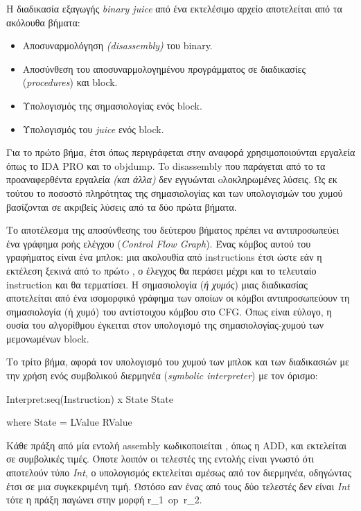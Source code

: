 Η διαδικασία εξαγωγής \emph{binary juice} από ένα εκτελέσιμο αρχείο αποτελείται από τα ακόλουθα βήματα:
\begin{itemize}
	\item Αποσυναρμολόγηση \emph{(disassembly)} του binary.
	\item Αποσύνθεση του αποσυναρμολογημένου προγράμματος σε διαδικασίες (\emph{procedures}) και block.
	\item Υπολογισμός της σημασιολογίας ενός block.
	\item Υπολογισμός του \emph{juice} ενός block.
\end{itemize}

Για το πρώτο βήμα, έτσι όπως περιγράφεται στην αναφορά χρησιμοποιούνται εργαλεία όπως το IDA PRO\cite{ida} και το objdump\cite{objdump}.
To disassembly που παράγεται από το τα προαναφερθέντα εργαλεία \emph{(και άλλα)} δεν εγγυώνται oλοκληρωμένες λύσεις.
Ως εκ τούτου το ποσοστό πληρότητας της σημασιολογίας και των υπολογισμών του χυμού βασίζονται σε ακριβείς λύσεις από τα δύο πρώτα βήματα.

Το αποτέλεσμα της αποσύνθεσης του δεύτερου βήματος πρέπει να αντιπροσωπεύει ένα γράφημα ροής ελέγχου (\emph{Control Flow Graph}).
Ένας κόμβος αυτού του γραφήματος είναι ένα μπλοκ: μια ακολουθία από instructions έτσι ώστε εάν η εκτέλεση ξεκινά από τo πρώτo , ο έλεγχος θα περάσει μέχρι και το τελευταίο instruction και θα τερματίσει.
Η σημασιολογία (\emph{ή χυμός}) μιας διαδικασίας αποτελείται από ένα ισομορφικό γράφημα των οποίων οι κόμβοι αντιπροσωπεύουν τη σημασιολογία (ή χυμό) του αντίστοιχου κόμβου στο CFG.
Όπως είναι εύλογο, η ουσία του αλγορίθμου έγκειται στον υπολογισμό της σημασιολογίας-χυμού των μεμονωμένων block.

Το τρίτο βήμα, αφορά τον υπολογισμό του χυμού των μπλοκ και των διαδικασιών με την χρήση ενός συμβολικού διερμηνέα (\emph{symbolic interpreter}) με τον όρισμο:

{\centering
	Interpret:seq(Instruction) x State \rightarrow\space State

	where State = LValue \rightarrow\space RValue
	\par
}

\pagebreak %
Κάθε πράξη από μία εντολή assembly κωδικοποιείται , όπως η ADD, και εκτελείται σε συμβολικές τιμές.
Όποτε λοιπόν οι τελεστές της εντολής είναι γνωστό ότι αποτελούν τύπο \emph{Int}, ο υπολογισμός εκτελείται αμέσως από τον διερμηνέα, οδηγώντας έτσι σε μια συγκεκριμένη τιμή.
Ωστόσο εαν ένας από τους δύο τελεστές  δεν είναι \emph{Int} τότε η πράξη παγώνει στην μορφή r_{1}\, op\, r_{2}.

